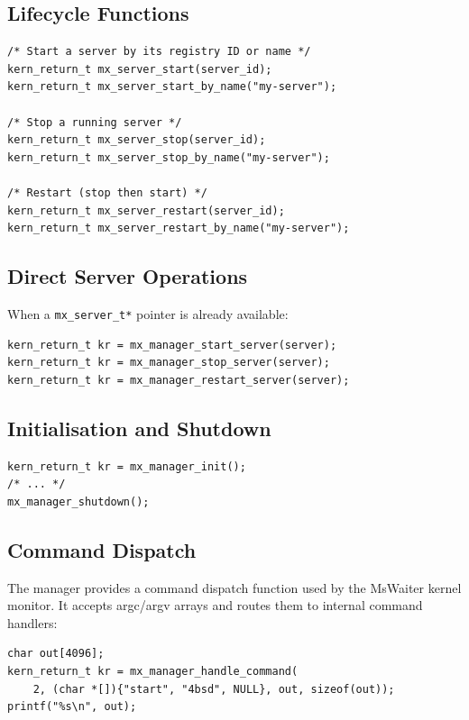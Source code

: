 \documentclass[a4paper,11pt]{article}
\begin{document}
\subsection{Lifecycle Functions}

\begin{lstlisting}
/* Start a server by its registry ID or name */
kern_return_t mx_server_start(server_id);
kern_return_t mx_server_start_by_name("my-server");

/* Stop a running server */
kern_return_t mx_server_stop(server_id);
kern_return_t mx_server_stop_by_name("my-server");

/* Restart (stop then start) */
kern_return_t mx_server_restart(server_id);
kern_return_t mx_server_restart_by_name("my-server");
\end{lstlisting}

\subsection{Direct Server Operations}

When a \texttt{mx\_server\_t*} pointer is already available:

\begin{lstlisting}
kern_return_t kr = mx_manager_start_server(server);
kern_return_t kr = mx_manager_stop_server(server);
kern_return_t kr = mx_manager_restart_server(server);
\end{lstlisting}

\subsection{Initialisation and Shutdown}

\begin{lstlisting}
kern_return_t kr = mx_manager_init();
/* ... */
mx_manager_shutdown();
\end{lstlisting}

\subsection{Command Dispatch}

The manager provides a command dispatch function used by the
MsWaiter kernel monitor. It accepts argc/argv arrays and routes
them to internal command handlers:

\begin{lstlisting}
char out[4096];
kern_return_t kr = mx_manager_handle_command(
    2, (char *[]){"start", "4bsd", NULL}, out, sizeof(out));
printf("%s\n", out);
\end{lstlisting}
\end{document}
